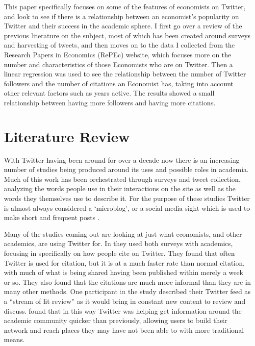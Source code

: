 \documentclass[12pt, Times New Roman]{article}
\begin{document}
This paper specifically focuses on some of the features of economists on Twitter, and look to see if there is a relationship between an economist’s popularity on Twitter and their success in the academic sphere. I first go over a review of the previous literature on the subject, most of which has been created around surveys and harvesting of tweets, and then moves on to the data I collected from the Research Papers in Economics (RePEc) website, which focuses more on the number and characteristics of those Economists who are on Twitter. Then a linear regression was used to see the relationship between the number of Twitter followers and the number of citations an Economist has, taking into account other relevant factors such as years active. The results showed a small relationship between having more followers and having more citations.



\section*{Literature Review}\label{sec:litreview}

With Twitter having been around for over a decade now there is an increasing number of studies being produced around its uses and possible roles in academia. Much of this work has been orchestrated through surveys and tweet collection, analyzing the words people use in their interactions on the site as well as the words they themselves use to describe it. For the purpose of these studies Twitter is almost always considered a ‘microblog’, or a social media sight which is used to make short and frequent posts \citet{Gerstein} .

Many of the studies coming out are looking at just what economists, and other academics, are using Twitter for. In \citet{Priem} they used both surveys with academics, focusing in specifically on how people cite on Twitter. They found that often Twitter is used for citation, but it is at a much faster rate than normal citation, with much of what is being shared having been published within merely a week or so. They also found that the citations are much more informal than they are in many other methods. One participant in the study described their Twitter feed as a “stream of lit review” as it would bring in constant new content to review and discuss. \citet{Priem} found that in this way Twitter was helping get information around the academic community quicker than previously, allowing users to build their network and reach places they may have not been able to with more traditional means. 
\end{document}
